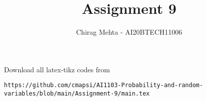 \documentclass[journal,12pt,twocolumn]{IEEEtran}
\DeclareMathOperator*{\Res}{Res}
\begin{document}
\newcommand{\BEQA}{\begin{eqnarray}}
\newcommand{\EEQA}{\end{eqnarray}}
\newcommand{\define}{\stackrel{\triangle}{=}}

\raggedbottom
\setlength{\parindent}{0pt}
\providecommand{\mbf}{\mathbf}
\providecommand{\pr}[1]{\ensuremath{\Pr\left(#1\right)}}
\providecommand{\qfunc}[1]{\ensuremath{Q\left(#1\right)}}
\providecommand{\sbrak}[1]{\ensuremath{{}\left[#1\right]}}
\providecommand{\lsbrak}[1]{\ensuremath{{}\left[#1\right.}}
\providecommand{\rsbrak}[1]{\ensuremath{{}\left.#1\right]}}
\providecommand{\brak}[1]{\ensuremath{\left(#1\right)}}
\providecommand{\lbrak}[1]{\ensuremath{\left(#1\right.}}
\providecommand{\rbrak}[1]{\ensuremath{\left.#1\right)}}
\providecommand{\cbrak}[1]{\ensuremath{\left\{#1\right\}}}
\providecommand{\lcbrak}[1]{\ensuremath{\left\{#1\right.}}
\providecommand{\rcbrak}[1]{\ensuremath{\left.#1\right\}}}
\DeclarePairedDelimiter\ceil{\lceil}{\rceil}
\DeclarePairedDelimiter\floor{\lfloor}{\rfloor}
\theoremstyle{remark}
\newtheorem{rem}{Remark}
\newcommand{\sgn}{\mathop{\mathrm{sgn}}}
\providecommand{\abs}[1]{\vert#1\vert}
\providecommand{\res}[1]{\Res\displaylimits_{#1}} 
\providecommand{\norm}[1]{\lVert#1\rVert}
\providecommand{\mtx}[1]{\mathbf{#1}}
\providecommand{\mean}[1]{E[ #1 ]}
\providecommand{\fourier}{\overset{\mathcal{F}}{ \rightleftharpoons}}
\providecommand{\system}{\overset{\mathcal{H}}{ \longleftrightarrow}}
\newcommand{\solution}{\noindent \textbf{Solution: }}
\newcommand{\cosec}{\,\text{cosec}\,}
\newcommand*{\permcomb}[4][0mu]{{{}^{#3}\mkern#1#2_{#4}}}
\newcommand*{\perm}[1][-3mu]{\permcomb[#1]{P}}
\newcommand*{\comb}[1][-1mu]{\permcomb[#1]{C}}
\providecommand{\dec}[2]{\ensuremath{\overset{#1}{\underset{#2}{\gtrless}}}}
\newcommand{\myvec}[1]{\ensuremath{\begin{pmatrix}#1\end{pmatrix}}}
\newcommand{\mydet}[1]{\ensuremath{\begin{vmatrix}#1\end{vmatrix}}}
\makeatletter
{}
\makeatother
\let\StandardTheFigure\thefigure
\let\vec\mathbf
\renewcommand{\thefigure}{\theproblem}
\def\putbox#1#2#3{\makebox[0in][l]{\makebox[#1][l]{}\raisebox{\baselineskip}[0in][0in]{\raisebox{#2}[0in][0in]{#3}}}}
     \def\rightbox#1{\makebox[0in][r]{#1}}
     \def\centbox#1{\makebox[0in]{#1}}
     \def\topbox#1{\raisebox{-\baselineskip}[0in][0in]{#1}}
     \def\midbox#1{\raisebox{-0.5\baselineskip}[0in][0in]{#1}}
\vspace{3cm}
\title{Assignment 9}
\author{Chirag Mehta - AI20BTECH11006}
\maketitle
\newpage
\bigskip
\renewcommand{\thefigure}{\theenumi}
\renewcommand{\thetable}{\theenumi}
Download all latex-tikz codes from 
\begin{lstlisting}
https://github.com/cmapsi/AI1103-Probability-and-random-variables/blob/main/Assignment-9/main.tex
\end{lstlisting}
\end{document}
